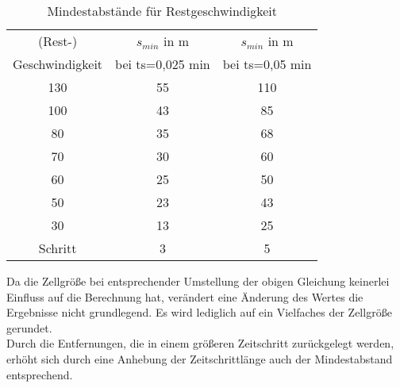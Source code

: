 \begin{table}[ht]
\begin{center}
\setlength{\tabcolsep}{0.5em} %
{\renewcommand{\arraystretch}{1.2}%
\begin{tabular}{| c  c  c |}
\hline 
(Rest-) & $ s_{min} $ in m & $ s_{min} $ in m  \\ 
Geschwindigkeit & bei ts=0,025 min & bei ts=0,05 min \\ \hline 
130 & 55 & 110 \\ 
100 & 43 & 85 \\ 
80 & 35 & 68 \\ 
70 & 30 & 60 \\ 
60 & 25 & 50 \\ 
50 & 23 & 43 \\ 
30 & 13 & 25 \\ 
Schritt & 3 & 5 \\ \hline
\end{tabular}
}
\caption{Mindestabstände für Restgeschwindigkeit}
\label{tab:restgeschw-abstand}
\end{center}
\end{table}

Da die Zellgröße bei entsprechender Umstellung der obigen Gleichung keinerlei Einfluss auf die Berechnung hat, verändert eine Änderung des Wertes die Ergebnisse nicht grundlegend. 
Es wird lediglich auf ein Vielfaches der Zellgröße gerundet.
\\
Durch die Entfernungen, die in einem größeren Zeitschritt zurückgelegt werden, erhöht sich durch eine Anhebung der Zeitschrittlänge auch der Mindestabstand entsprechend.












